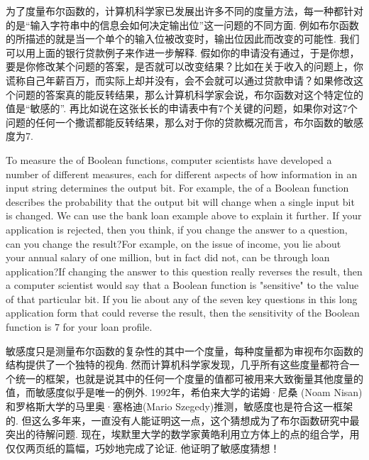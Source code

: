 \begin{multicols}{2}

为了度量布尔函数的，计算机科学家已发展出许多不同的度量方法，每一种都针对的是“输入字符串中的信息会如何决定输出位”这一问题的不同方面. 例如布尔函数的所描述的就是当一个单个的输入位被改变时，输出位因此而改变的可能性. 我们可以用上面的银行贷款例子来作进一步解释. 假如你的申请没有通过，于是你想，要是你修改某个问题的答案，是否就可以改变结果？比如在关于收入的问题上，你谎称自己年薪百万，而实际上却并没有，会不会就可以通过贷款申请？如果修改这个问题的答案真的能反转结果，那么计算机科学家会说，布尔函数对这个特定位的值是“敏感的”. 再比如说在这张长长的申请表中有7个关键的问题，如果你对这7个问题的任何一个撒谎都能反转结果，那么对于你的贷款概况而言，布尔函数的敏感度为7. 

To measure the  of Boolean functions, computer scientists have developed a number of different measures, each for different aspects of how information in an input string determines the output bit. For example, the  of a Boolean function describes the probability that the output bit will change when a single input bit is changed. We can use the bank loan example above to explain it further. If your application is rejected, then you think, if you change the answer to a question, can you change the result?For example, on the issue of income, you lie about your annual salary of one million, but in fact did not, can be through loan application?If changing the answer to this question really reverses the result, then a computer scientist would say that a Boolean function is "sensitive" to the value of that particular bit. If you lie about any of the seven key questions in this long application form that could reverse the result, then the sensitivity of the Boolean function is 7 for your loan profile. 

敏感度只是测量布尔函数的复杂性的其中一个度量，每种度量都为审视布尔函数的结构提供了一个独特的视角. 然而计算机科学家发现，几乎所有这些度量都符合一个统一的框架，也就是说其中的任何一个度量的值都可被用来大致衡量其他度量的值，而敏感度似乎是唯一的例外. 1992年，希伯来大学的诺姆·尼桑 (Noam Nisan)和罗格斯大学的马里奥·塞格迪(Mario Szegedy)推测，敏感度也是符合这一框架的. 但这么多年来，一直没有人能证明这一点，这个猜想成为了布尔函数研究中最突出的待解问题. 现在，埃默里大学的数学家黄皓利用立方体上的点的组合学，用仅仅两页纸的篇幅，巧妙地完成了论证. 他证明了敏感度猜想！


\end{multicols}
